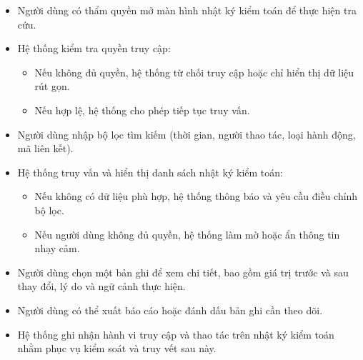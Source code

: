\begin{itemize}
    \item Người dùng có thẩm quyền mở màn hình nhật ký kiểm toán để thực hiện tra cứu.
    
    \item Hệ thống kiểm tra quyền truy cập:
    \begin{itemize}
        \item Nếu không đủ quyền, hệ thống từ chối truy cập hoặc chỉ hiển thị dữ liệu rút gọn.
        \item Nếu hợp lệ, hệ thống cho phép tiếp tục truy vấn.
    \end{itemize}
    
    \item Người dùng nhập bộ lọc tìm kiếm (thời gian, người thao tác, loại hành động, mã liên kết).
    
    \item Hệ thống truy vấn và hiển thị danh sách nhật ký kiểm toán:
    \begin{itemize}
        \item Nếu không có dữ liệu phù hợp, hệ thống thông báo và yêu cầu điều chỉnh bộ lọc.
        \item Nếu người dùng không đủ quyền, hệ thống làm mờ hoặc ẩn thông tin nhạy cảm.
    \end{itemize}
    
    \item Người dùng chọn một bản ghi để xem chi tiết, bao gồm giá trị trước và sau thay đổi, lý do và ngữ cảnh thực hiện.
    
    \item Người dùng có thể xuất báo cáo hoặc đánh dấu bản ghi cần theo dõi.
    
    \item Hệ thống ghi nhận hành vi truy cập và thao tác trên nhật ký kiểm toán nhằm phục vụ kiểm soát và truy vết sau này.
\end{itemize}

